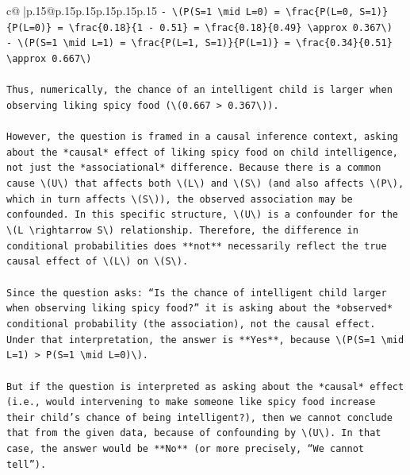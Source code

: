 \documentclass{article}
\begin{document}
{\begin{supertabular}{c@{$\;$}|p{.15\linewidth}@{}p{.15\linewidth}p{.15\linewidth}p{.15\linewidth}p{.15\linewidth}p{.15\linewidth}}
{{{\texttt{{-} \textbackslash{}(P(S=1 \textbackslash{}mid L=0) = \textbackslash{}frac\{P(L=0, S=1)\}\{P(L=0)\} = \textbackslash{}frac\{0.18\}\{1 {-} 0.51\} = \textbackslash{}frac\{0.18\}\{0.49\} \textbackslash{}approx 0.367\textbackslash{})} \\
\texttt{{-} \textbackslash{}(P(S=1 \textbackslash{}mid L=1) = \textbackslash{}frac\{P(L=1, S=1)\}\{P(L=1)\} = \textbackslash{}frac\{0.34\}\{0.51\} \textbackslash{}approx 0.667\textbackslash{})} \\
\\ 
\texttt{Thus, numerically, the chance of an intelligent child is larger when observing liking spicy food (\textbackslash{}(0.667 > 0.367\textbackslash{})).} \\
\\ 
\texttt{However, the question is framed in a causal inference context, asking about the *causal* effect of liking spicy food on child intelligence, not just the *associational* difference. Because there is a common cause \textbackslash{}(U\textbackslash{}) that affects both \textbackslash{}(L\textbackslash{}) and \textbackslash{}(S\textbackslash{}) (and also affects \textbackslash{}(P\textbackslash{}), which in turn affects \textbackslash{}(S\textbackslash{})), the observed association may be confounded. In this specific structure, \textbackslash{}(U\textbackslash{}) is a confounder for the \textbackslash{}(L \textbackslash{}rightarrow S\textbackslash{}) relationship. Therefore, the difference in conditional probabilities does **not** necessarily reflect the true causal effect of \textbackslash{}(L\textbackslash{}) on \textbackslash{}(S\textbackslash{}).} \\
\\ 
\texttt{Since the question asks: “Is the chance of intelligent child larger when observing liking spicy food?” it is asking about the *observed* conditional probability (the association), not the causal effect. Under that interpretation, the answer is **Yes**, because \textbackslash{}(P(S=1 \textbackslash{}mid L=1) > P(S=1 \textbackslash{}mid L=0)\textbackslash{}).} \\
\\ 
\texttt{But if the question is interpreted as asking about the *causal* effect (i.e., would intervening to make someone like spicy food increase their child’s chance of being intelligent?), then we cannot conclude that from the given data, because of confounding by \textbackslash{}(U\textbackslash{}). In that case, the answer would be **No** (or more precisely, “We cannot tell”).} \\
}}}
\end{supertabular}}
\end{document}
